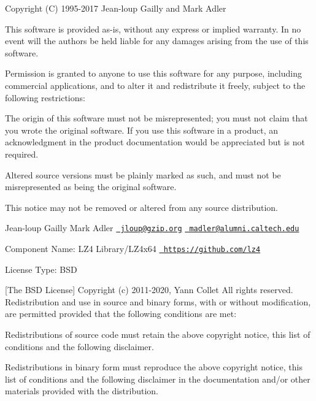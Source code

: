 Copyright (C) 1995-\/2017 Jean-\/loup Gailly and Mark Adler

This software is provided \textquotesingle{}as-\/is\textquotesingle{}, without any express or implied warranty. In no event will the authors be held liable for any damages arising from the use of this software.

Permission is granted to anyone to use this software for any purpose, including commercial applications, and to alter it and redistribute it freely, subject to the following restrictions\+:


\begin{DoxyEnumerate}
\item The origin of this software must not be misrepresented; you must not claim that you wrote the original software. If you use this software in a product, an acknowledgment in the product documentation would be appreciated but is not required.
\item Altered source versions must be plainly marked as such, and must not be misrepresented as being the original software.
\item This notice may not be removed or altered from any source distribution.
\end{DoxyEnumerate}

Jean-\/loup Gailly Mark Adler \href{mailto:jloup@gzip.org}{\texttt{ jloup@gzip.\+org}} \href{mailto:madler@alumni.caltech.edu}{\texttt{ madler@alumni.\+caltech.\+edu}}

 Component Name\+: LZ4 Library/\+LZ4x64 \href{https://github.com/lz4}{\texttt{ https\+://github.\+com/lz4}}

License Type\+: BSD

\mbox{[}The BSD License\mbox{]} Copyright (c) 2011-\/2020, Yann Collet All rights reserved. Redistribution and use in source and binary forms, with or without modification, are permitted provided that the following conditions are met\+:


\begin{DoxyItemize}
\item Redistributions of source code must retain the above copyright notice, this list of conditions and the following disclaimer.
\item Redistributions in binary form must reproduce the above copyright notice, this list of conditions and the following disclaimer in the documentation and/or other materials provided with the distribution.
\end{DoxyItemize}

